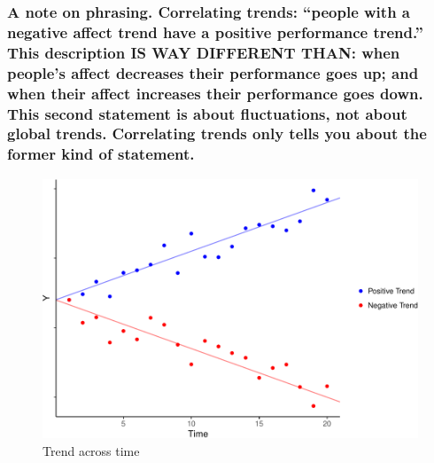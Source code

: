 \documentclass[english,,man]{apa6}
\theoremstyle{definition}
\theoremstyle{definition}
\theoremstyle{definition}
\theoremstyle{remark}
\begin{document}
\hypertarget{a-note-on-phrasing.-correlating-trends-people-with-a-negative-affect-trend-have-a-positive-performance-trend.-this-description-is-way-different-than-when-peoples-affect-decreases-their-performance-goes-up-and-when-their-affect-increases-their-performance-goes-down.-this-second-statement-is-about-fluctuations-not-about-global-trends.-correlating-trends-only-tells-you-about-the-former-kind-of-statement.}{%
\subsubsection{\texorpdfstring{A note on phrasing. Correlating trends:
\enquote{people with a negative affect trend have a positive performance
trend.} This description IS WAY DIFFERENT THAN: when people's affect
decreases their performance goes up; and when their affect increases
their performance goes down. This second statement is about
fluctuations, not about global trends. Correlating trends only tells you
about the former kind of
statement.}{A note on phrasing. Correlating trends: ``people with a negative affect trend have a positive performance trend.'' This description IS WAY DIFFERENT THAN: when people's affect decreases their performance goes up; and when their affect increases their performance goes down. This second statement is about fluctuations, not about global trends. Correlating trends only tells you about the former kind of statement.}}\label{a-note-on-phrasing.-correlating-trends-people-with-a-negative-affect-trend-have-a-positive-performance-trend.-this-description-is-way-different-than-when-peoples-affect-decreases-their-performance-goes-up-and-when-their-affect-increases-their-performance-goes-down.-this-second-statement-is-about-fluctuations-not-about-global-trends.-correlating-trends-only-tells-you-about-the-former-kind-of-statement.}}

\begin{figure}
\centering
\includegraphics{figures/unnamed-chunk-12-1.pdf}
\caption{\label{fig:unnamed-chunk-12}Trend across time\label{trend}}
\end{figure}
\end{document}
